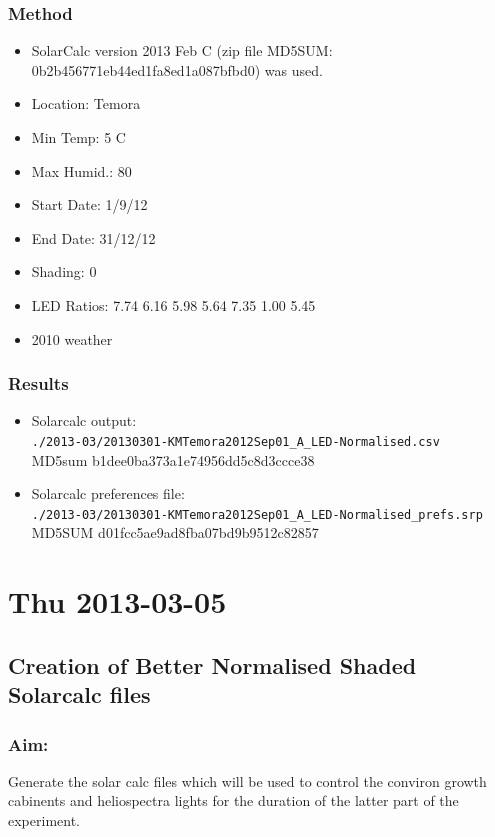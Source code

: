 \documentclass[12pt,a4paper]{book}
\begin{document}
    \subsection*{Method}
      \begin{itemize} \itemsep1pt \parskip0pt 
        \item SolarCalc version 2013 Feb C (zip file MD5SUM: 0b2b456771eb44ed1fa8ed1a087bfbd0) was
          used.
        \item Location: Temora
        \item Min Temp: 5 C
        \item Max Humid.: 80
        \item Start Date: 1/9/12
        \item End Date: 31/12/12
        \item Shading: 0
        \item LED Ratios: 7.74 6.16 5.98 5.64 7.35 1.00 5.45
        \item 2010 weather
      \end{itemize}
    \subsection*{Results}
      \begin{itemize} \itemsep1pt \parskip0pt 
        \item Solarcalc output:\\
          \verb+./2013-03/20130301-KMTemora2012Sep01_A_LED-Normalised.csv+ \\
          MD5sum b1dee0ba373a1e74956dd5c8d3ccce38
        \item Solarcalc preferences file:\\
          \verb+./2013-03/20130301-KMTemora2012Sep01_A_LED-Normalised_prefs.srp+ \\
          MD5SUM d01fcc5ae9ad8fba07bd9b9512c82857
      \end{itemize}

\chapter*{Thu 2013-03-05}
  \section*{Creation of Better Normalised Shaded Solarcalc files}
    \subsection*{Aim:}
      Generate the solar calc files which will be used to control the conviron growth cabinents and
      heliospectra lights for the duration of the latter part of the experiment.
\end{document}
